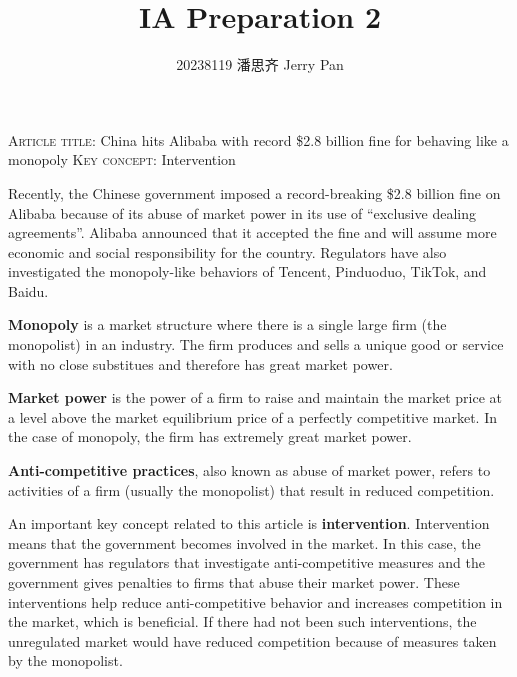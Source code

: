 \documentclass{article}
\begin{document}
\title{\vspace{-2.75cm} IA Preparation 2}
\author{20238119 潘思齐 Jerry Pan}
\date{}
\maketitle

\noindent \textsc{Article title}: China hits Alibaba with record \$2.8 billion fine for behaving like a monopoly \newline
\textsc{Key concept}: Intervention

\noindent \hrulefill

\vspace{0.5cm}

Recently, the Chinese government imposed a record-breaking \$2.8 billion fine on Alibaba because of its abuse of market power in its use of ``exclusive dealing agreements''. Alibaba announced that it accepted the fine and will assume more economic and social responsibility for the country. Regulators have also investigated the monopoly-like behaviors of Tencent, Pinduoduo, TikTok, and Baidu.

\vspace{0.5cm}

\textbf{Monopoly} is a market structure where there is a single large firm (the monopolist) in an industry. The firm produces and sells a unique good or service with no close substitues and therefore has great market power. 

\textbf{Market power} is the power of a firm to raise and maintain the market price at a level above the market equilibrium price of a perfectly competitive market. In the case of monopoly, the firm has extremely great market power. 

\textbf{Anti-competitive practices}, also known as abuse of market power, refers to activities of a firm (usually the monopolist) that result in reduced competition.

\vspace{0.5cm}

An important key concept related to this article is \textbf{intervention}. Intervention means that the government becomes involved in the market. In this case, the government has regulators that investigate anti-competitive measures and the government gives penalties to firms that abuse their market power. These interventions help reduce anti-competitive behavior and increases competition in the market, which is beneficial. If there had not been such interventions, the unregulated market would have reduced competition because of measures taken by the monopolist.
\end{document}
